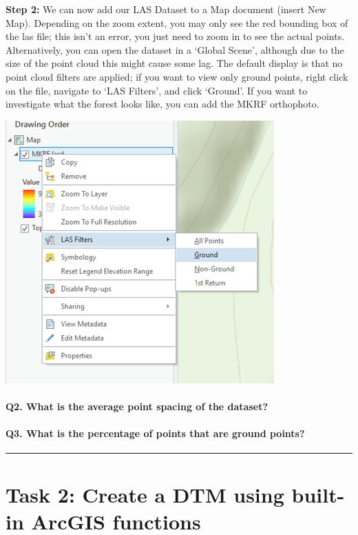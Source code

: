 \documentclass[
]{book}
\begin{document}
\textbf{Step 2:} We can now add our LAS Dataset to a Map document (insert New Map). Depending on the zoom extent, you may only see the red bounding box of the las file; this isn't an error, you just need to zoom in to see the actual points. Alternatively, you can open the dataset in a `Global Scene', although due to the size of the point cloud this might cause some lag. The default display is that no point cloud filters are applied; if you want to view only ground points, right click on the file, navigate to `LAS Filters', and click `Ground'. If you want to investigate what the forest looks like, you can add the MKRF orthophoto.

\begin{center}\includegraphics[width=0.4\linewidth]{images/04-view-and-filter-dataset} \end{center}

\hypertarget{q2.-what-is-the-average-point-spacing-of-the-dataset}{%
\paragraph*{Q2. What is the average point spacing of the dataset?}\label{q2.-what-is-the-average-point-spacing-of-the-dataset}}

\hypertarget{q3.-what-is-the-percentage-of-points-that-are-ground-points}{%
\paragraph*{Q3. What is the percentage of points that are ground points?}\label{q3.-what-is-the-percentage-of-points-that-are-ground-points}}

\begin{center}\rule{0.5\linewidth}{0.5pt}\end{center}

\hypertarget{task-2-create-a-dtm-using-built-in-arcgis-functions}{%
\section*{Task 2: Create a DTM using built-in ArcGIS functions}\label{task-2-create-a-dtm-using-built-in-arcgis-functions}}
\end{document}
